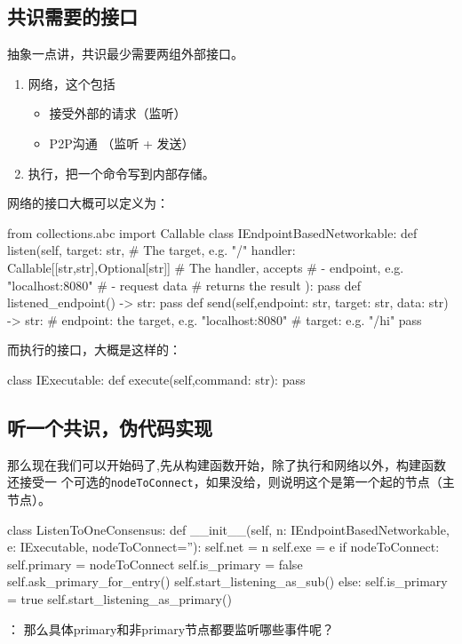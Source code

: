 \documentclass[dvipsnames]{ctexart}
\begin{document}
\subsection{共识需要的接口}
抽象一点讲，共识最少需要两组外部接口。
\begin{enumerate}
\item 网络，这个包括
  \begin{itemize}
  \item 接受外部的请求（监听）
  \item P2P沟通 （监听 + 发送）
  \end{itemize}
\item 执行，把一个命令写到内部存储。
\end{enumerate}
网络的接口大概可以定义为：
\begin{simplepy}
from collections.abc import Callable
class IEndpointBasedNetworkable:
    def listen(self,
               target: str,     # The target, e.g. "/"
               handler: Callable[[str,str],Optional[str]]
               # The handler, accepts
               #  - endpoint, e.g. "localhost:8080"
               #  - request data
               # returns the result
               ):
        pass
    def listened_endpoint() -> str:
        pass
    def send(self,endpoint: str, target: str, data: str) -> str:
        # endpoint: the target, e.g. "localhost:8080"
        # target: e.g. "/hi"
        pass
\end{simplepy}
而执行的接口，大概是这样的：
\begin{simplepy}
class IExecutable:
    def execute(self,command: str):
        pass
\end{simplepy}

\subsection{\textbf{听一个共识}，伪代码实现}
那么现在我们可以开始码了,先从构建函数开始，除了执行和网络以外，构建函数还接受一
个可选的\texttt{nodeToConnect}，如果没给，则说明这个是第一个起的节点（主节点）。
\begin{simplepy}
class ListenToOneConsensus:
    def __init__(self,
                 n: IEndpointBasedNetworkable,
                 e: IExecutable,
                 nodeToConnect=''):
        self.net = n
        self.exe = e
        if nodeToConnect:
            self.primary = nodeToConnect
            self.is_primary = false
            self.ask_primary_for_entry()
            self.start_listening_as_sub()
        else:
            self.is_primary = true
            self.start_listening_as_primary()
\end{simplepy}
 ： 那么具体primary和非primary节点都要监听哪些事件呢？
\end{document}
